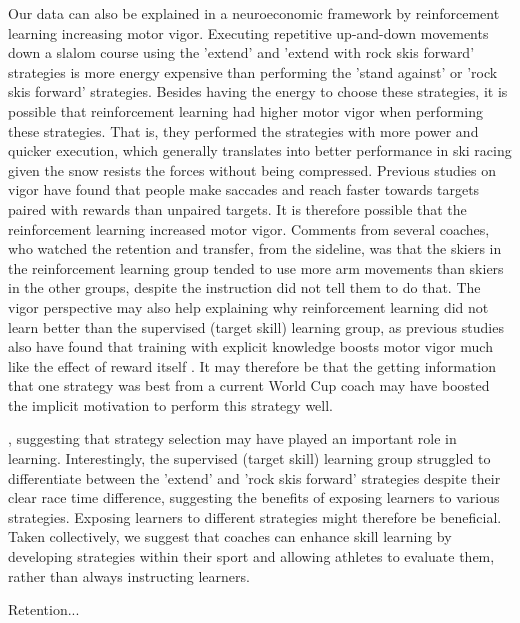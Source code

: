 Our data can also be explained in a neuroeconomic framework \cite{pietro_mazzoni_why_2007, dudman_basal_2016}  by reinforcement learning increasing motor vigor. Executing repetitive up-and-down movements down a slalom course using the 'extend' and 'extend with rock skis forward' strategies is more energy expensive than performing the 'stand against' or 'rock skis forward' strategies. Besides having the energy to choose these strategies, it is possible that reinforcement learning had higher motor vigor when performing these strategies. That is, they performed the strategies with more power and quicker execution, which generally translates into better performance in ski racing given the snow resists the forces without being compressed. Previous studies on vigor have found that people make saccades \cite{takikawa_modulation_2002} and reach\cite{summerside_vigor_2018} faster towards targets paired with rewards than unpaired targets. It is therefore possible that the reinforcement learning increased motor vigor. Comments from several coaches, who watched the retention and transfer, from the sideline, was that the skiers in the reinforcement learning group tended to use more arm movements than skiers in the other groups, despite the instruction did not tell them to do that. The vigor perspective may also help explaining why reinforcement learning did not learn better than the supervised (target skill) learning group, as previous studies also have found that training with explicit knowledge boosts motor vigor much like the effect of reward itself \cite{anderson_rewards_2020, wong_explicit_2015}. It may therefore be that the getting information that one strategy was best from a current World Cup coach may have boosted the implicit motivation to perform this strategy well. 



, suggesting that strategy selection may have played an important role in learning. Interestingly, the supervised (target skill) learning group struggled to differentiate between the 'extend' and 'rock skis forward' strategies despite their clear race time difference, suggesting the benefits of exposing learners to various strategies. Exposing learners to different strategies might therefore be beneficial. Taken collectively, we suggest that coaches can enhance skill learning by developing strategies within their sport and allowing athletes to evaluate them, rather than always instructing learners.

Retention...

